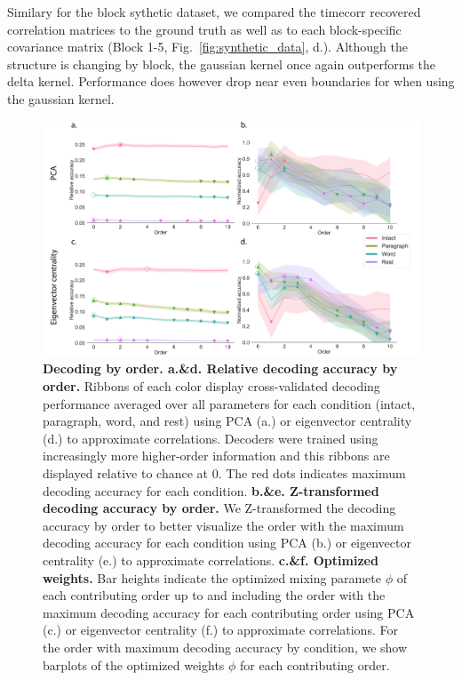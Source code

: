 \documentclass[english]{article}
\begin{document}
Similary for the block sythetic dataset, we compared the timecorr
recovered correlation matrices to the ground truth as well as to each
block-specific covariance matrix (Block 1-5,
Fig.~\ref{fig:synthetic_data},  d.).  Although the structure is
changing by block, the gaussian kernel once again outperforms the
delta kernel.  Performance does however drop near even boundaries for
when using the gaussian kernel. 



\begin{figure}
  \centering
  \includegraphics[width=\textwidth]{figs/decode_level.pdf}
  \caption{\textbf{Decoding by order.
      a.\&d. Relative decoding accuracy by order.} Ribbons of each
    color display cross-validated decoding performance averaged over
    all parameters for each condition (intact, paragraph, word,
    and rest) using PCA (a.) or eigenvector centrality (d.) to
    approximate correlations. Decoders were trained using increasingly more
    higher-order information and this ribbons are displayed relative
    to chance at 0. The red dots indicates
    maximum decoding accuracy for each condition. \textbf{b.\&e. Z-transformed decoding accuracy
      by order.}  We Z-transformed the decoding accuracy by order to better
    visualize the order with the maximum decoding accuracy for each
    condition using PCA (b.) or eigenvector centrality (e.) to
    approximate correlations. \textbf{c.\&f. Optimized weights.} Bar heights indicate the
    optimized mixing paramete $\phi$ of each contributing order up to
    and including the order with the maximum
    decoding accuracy for each contributing order using PCA (c.) or eigenvector centrality (f.) to
    approximate correlations.
  For the order with maximum decoding accuracy by condition, we show
  barplots of the optimized weights $\phi$  for each contributing
  order.}
  \label{fig:decoding_level}
\end{figure}
\end{document}
